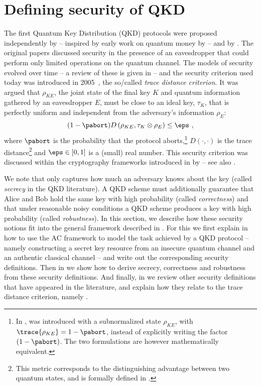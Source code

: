 \section{Defining security of QKD}
\label{sec:qkd}

The first Quantum Key Distribution (QKD) protocols were proposed
independently by \textcite{BB84} \--- inspired by early work on
quantum money by \textcite{Wie83} \--- and by \textcite{Eke91}. The
original papers discussed security in the presence of an eavesdropper
that could perform only limited operations on the quantum channel. The
models of security evolved over time \--- a review of these is given
in  \--- and the security criterion used today
was introduced in 2005~\cite{RK05,BHLMO05,Ren05}, the so\-/called
\emph{trace distance criterion}. It was argued that $\rho_{KE}$, the
joint state of the final key $K$ and quantum information gathered by
an eavesdropper $E$, must be close to an ideal key, $\tau_K$, that is
perfectly uniform and independent from the adversary's information
$\rho_E$:
\begin{equation} \label{eq:d} (1-\pabort) D \left(     \rho_{KE},\tau_K \otimes \rho_E \right) \leq \eps \   ,
\end{equation} 
where $\pabort$ is the probability that the protocol
aborts,\footnote{In \textcite{Ren05},  was introduced
  with a subnormalized state $\rho_{KE}$, with
  $\trace{\rho_{KE}}=1-\pabort$, instead of explicitly writing the
  factor $(1-\pabort)$. The two formulations are however
  mathematically equivalent.} $D(\cdot,\cdot)$ is the trace
distance\footnote{This metric corresponds to the distinguishing
  advantage between two quantum states, and is formally defined in
  .} and $\eps \in [0,1]$ is a (small) real
number. This security criterion was discussed within the cryptography
frameworks introduced in  by \textcite{BHLMO05,MR09}
\--- see also .

We note that  only captures how much an adversary knows
about the key (called \emph{secrecy} in the QKD literature). A QKD
scheme must additionally guarantee that Alice and Bob hold the same
key with high probability (called \emph{correctness}) and that under
reasonable noisy conditions a QKD scheme produces a key with high
probability (called \emph{robustness}). In this section, we describe
how these security notions fit into the general framework described in
. For this we first explain in
 how to use the AC framework to model the
task achieved by a QKD protocol \--- namely constructing a secret key
resource from an insecure quantum channel and an authentic classical
channel \--- and write out the corresponding security
definitions. Then in  we show how to derive
secrecy, correctness and robustness from these security
definitions. And finally, in  we review other
security definitions that have appeared in the literature, and explain
how they relate to the trace distance criterion, namely .


